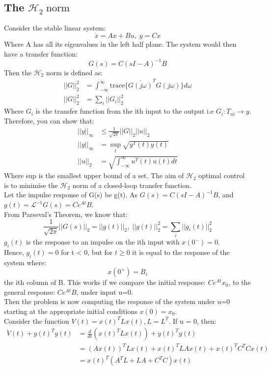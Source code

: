 \documentclass{article}
\begin{document}
\subsection{The \texorpdfstring{$\mathcal{H}_2 \; \text{norm}$} .}
Consider the stable linear system:
\[
\dot x = Ax + Bu, \; y = Cx
\]
Where A has all its eigenvalues in the left half plane. The system would then have a transfer function:
\[
G(s) = C(sI - A)^{-1} B
\]
Then the $\mathcal{H}_2$ norm is defined as:
\[
\begin{aligned}
    ||G||_2^2 &= \int_{-\infty}^\infty \text{trace}\{\bar{G(j\omega)}^T G(j\omega) \} d\omega \\
    ||G||_2^2 &= \sum_i ||G_i||_2^2
\end{aligned}
\]
Where $G_i$ is the transfer function from the ith input to the output i.e $G_i : T_{ui} \rightarrow y$. \\
Therefore, you can show that:
\[
\begin{aligned}
||y||_\infty &\leq \frac{1}{\sqrt{2 \pi}}||G||_2 ||u||_2 \\
||y||_\infty &= \sup_t \sqrt{y^T(t) y(t)} \\
||u||_2 &= \sqrt{\int_{-\infty}^\infty u^T(t) u(t) dt}
\end{aligned}
\]
Where sup is the smallest upper bound of a set. The aim of $\mathcal{H}_2$ optimal control is to minimise the $\mathcal{H}_2$ norm of a closed-loop transfer function. \\ 
Let the impulse response of G(s) be g(t). As $G(s) = C(sI-A)^{-1} B$, and $g(t) = \mathcal{L}^{-1} G(s) = Ce^{At} B$. \\
From Parseval's Theorem, we know that: 
\[
\frac{1}{\sqrt{2\pi}} ||G(s)||_2 = ||g(t)||_2, \; ||g(t)||_2^2 = \sum_i ||g_i(t)||_2^2
\]
$g_i(t)$ is the response to an impulse on the ith input with $x(0^{-}) = 0$. \\ 
Hence,  $g_i(t) = 0$ for t < 0, but for $t \geq 0$ it is equal to the response of the system where: 
\[ x(0^+) = B_i \]
the ith column of B. This works if we compare the initial response: $Ce^{At} x_0$, to the general response: $Ce^{At} B$, under input u=0. \\
Then the problem is now computing the response of the system under u=0 starting at the appropriate initial conditions $x(0) = x_0$. \\
Consider the function $V(t) = x(t)^T L x(t), L = L^T$. If u = 0, then: \[ \begin{aligned}
\dot V(t) + y(t)^T y(t) &= \frac{d}{dt} (x(t)^T L x(t)) + y(t)^T y(t) \\
&= (Ax(t))^T L x(t) + x(t)^T LAx(t) + x(t)^T C^T C x(t) \\
&= x(t)^T (A^T L + LA + C^TC) x(t)
\end{aligned}
\]
\end{document}
